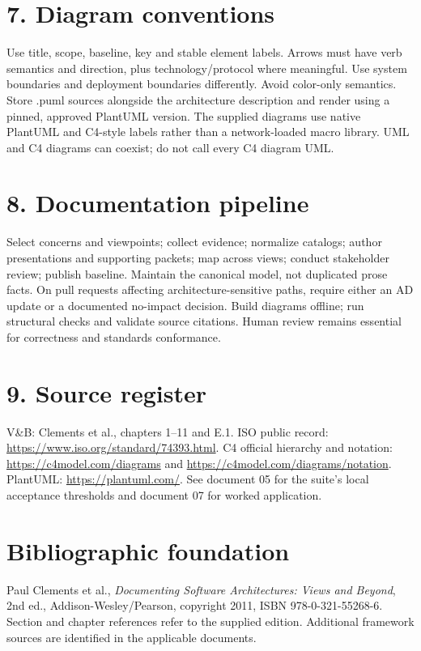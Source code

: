 \documentclass[11pt,letterpaper]{article}
\begin{document}
\section*{7. Diagram conventions}
Use title, scope, baseline, key and stable element labels. Arrows must have verb semantics and direction, plus technology/protocol where meaningful. Use system boundaries and deployment boundaries differently. Avoid color-only semantics. Store .puml sources alongside the architecture description and render using a pinned, approved PlantUML version. The supplied diagrams use native PlantUML and C4-style labels rather than a network-loaded macro library. UML and C4 diagrams can coexist; do not call every C4 diagram UML.\par\smallskip
\section*{8. Documentation pipeline}
Select concerns and viewpoints; collect evidence; normalize catalogs; author presentations and supporting packets; map across views; conduct stakeholder review; publish baseline. Maintain the canonical model, not duplicated prose facts. On pull requests affecting architecture-sensitive paths, require either an AD update or a documented no-impact decision. Build diagrams offline; run structural checks and validate source citations. Human review remains essential for correctness and standards conformance.\par\smallskip
\section*{9. Source register}
V\&B: Clements et al., chapters 1--11 and E.1. ISO public record: \url{https://www.iso.org/standard/74393.html}. C4 official hierarchy and notation: \url{https://c4model.com/diagrams} and \url{https://c4model.com/diagrams/notation}. PlantUML: \url{https://plantuml.com/}. See document 05 for the suite's local acceptance thresholds and document 07 for worked application.\par\smallskip
\section*{Bibliographic foundation}
Paul Clements et al., \emph{Documenting Software Architectures: Views and Beyond}, 2nd ed., Addison-Wesley/Pearson, copyright 2011, ISBN 978-0-321-55268-6. Section and chapter references refer to the supplied edition. Additional framework sources are identified in the applicable documents.\par
\end{document}
